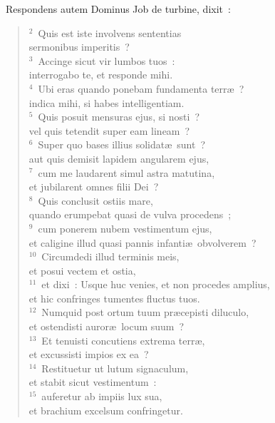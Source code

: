 ~\lettrine[lines=10,image=true,loversize=0.05,lraise=-0.03]{R}{}espondens autem Dominus Job de turbine, dixit~:
\begin{flushleft}\begin{verse}\vspace{6pt}${}^{2}$~Quis est iste involvens sententias\\ sermonibus imperitis~?\\
${}^{3}$~Accinge sicut vir lumbos tuos~:\\ interrogabo te, et responde mihi.\\
${}^{4}$~Ubi eras quando ponebam fundamenta terr\ae~?\\ indica mihi, si habes intelligentiam.\\
${}^{5}$~Quis posuit mensuras ejus, si nosti~?\\ vel quis tetendit super eam lineam~?\\
${}^{6}$~Super quo bases illius solidat\ae\ sunt~?\\ aut quis demisit lapidem angularem ejus,\\
${}^{7}$~cum me laudarent simul astra matutina,\\ et jubilarent omnes filii Dei~?\\
${}^{8}$~Quis conclusit ostiis mare,\\ quando erumpebat quasi de vulva procedens~;\\
${}^{9}$~cum ponerem nubem vestimentum ejus,\\ et caligine illud quasi pannis infanti\ae\ obvolverem~?\\
${}^{10}$~Circumdedi illud terminis meis,\\ et posui vectem et ostia,\\
${}^{11}$~et dixi~: Usque huc venies, et non procedes amplius,\\ et hic confringes tumentes fluctus tuos.\\
${}^{12}$~Numquid post ortum tuum pr\ae cepisti diluculo,\\ et ostendisti auror\ae\ locum suum~?\\
${}^{13}$~Et tenuisti concutiens extrema terr\ae ,\\ et excussisti impios ex ea~?\\
${}^{14}$~Restituetur ut lutum signaculum,\\ et stabit sicut vestimentum~:\\
${}^{15}$~auferetur ab impiis lux sua,\\ et brachium excelsum confringetur.\\

\end{verse}
\end{flushleft}
